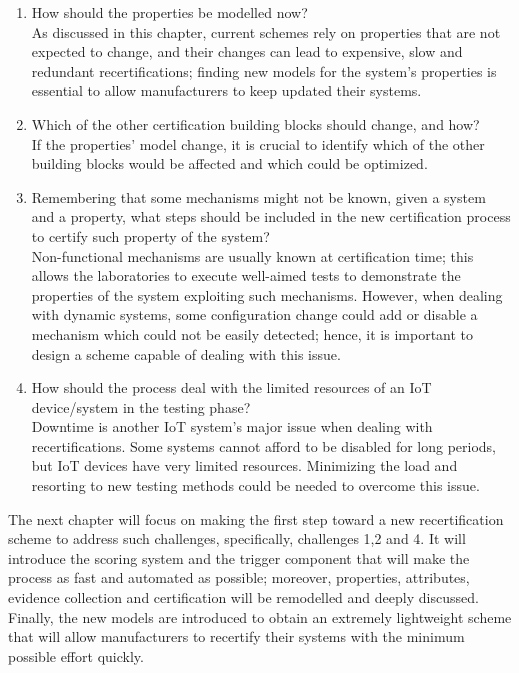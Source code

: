 \begin{enumerate}
    \item How should the properties be modelled now?\\ 
    As discussed in this chapter, current schemes rely on properties that are not expected to change, and their changes can lead to expensive, slow and redundant recertifications; finding new models for the system's properties is essential to allow manufacturers to keep updated their systems.
    
    \item Which of the other certification building blocks should change, and how?\\
    If the properties' model change, it is crucial to identify which of the other building blocks would be affected and which could be optimized.
    
    \item Remembering that some mechanisms might not be known, given a system and a property, what steps should be included in the new certification process to certify such property of the system?\\
    Non-functional mechanisms are usually known at certification time; this allows the laboratories to execute well-aimed tests to demonstrate the properties of the system exploiting such mechanisms. However, when dealing with dynamic systems, some configuration change could add or disable a mechanism which could not be easily detected; hence, it is important to design a scheme capable of dealing with this issue.
    
    \item How should the process deal with the limited resources of an IoT device/system in the testing phase?\\
    Downtime is another IoT system's major issue when dealing with recertifications. Some systems cannot afford to be disabled for long periods, but IoT devices have very limited resources. Minimizing the load and resorting to new testing methods could be needed to overcome this issue.
\end{enumerate}

The next chapter will focus on making the first step toward a new recertification scheme to address such challenges, specifically, challenges 1,2 and 4. It will introduce the scoring system and the trigger component that will make the process as fast and automated as possible; moreover, properties, attributes, evidence collection and certification will be remodelled and deeply discussed. Finally, the new models are introduced to obtain an extremely lightweight scheme that will allow manufacturers to recertify their systems with the minimum possible effort quickly.


